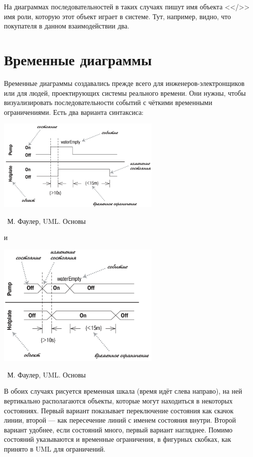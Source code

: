 \documentclass[a5paper]{article}
\newcommand{\attribution}[1] {
    \vspace{-5mm}\begin{flushright}\begin{scriptsize}%
    {\textcopyright\, #1}\end{scriptsize}\end{flushright}
}
\begin{document}
На диаграммах последовательностей в таких случаях пишут имя объекта <</>> имя роли, которую этот объект играет в системе. Тут, например, видно, что покупателя в данном взаимодействии два.

\section{Временные диаграммы}

Временные диаграммы создавались прежде всего для инженеров-электронщиков или для людей, проектирующих системы реального времени. Они нужны, чтобы визуализировать последовательности событий с чёткими временными ограничениями. Есть два варианта синтаксиса:

\begin{center}
    \includegraphics[width=0.6\textwidth]{timingDiagrams.png}
    \attribution{М. Фаулер, UML. Основы}
\end{center}

и

\begin{center}
    \includegraphics[width=0.6\textwidth]{timingDiagramsAlternate.png}
    \attribution{М. Фаулер, UML. Основы}
\end{center}

В обоих случаях рисуется временная шкала (время идёт слева направо), на ней вертикально располагаются объекты, которые могут находиться в некоторых состояниях. Первый вариант показывает переключение состояния как скачок линии, второй --- как пересечение линий с именем состояния внутри. Второй вариант удобнее, если состояний много, первый вариант нагляднее. Помимо состояний указываются и временные ограничения, в фигурных скобках, как принято в UML для ограничений.
\end{document}
